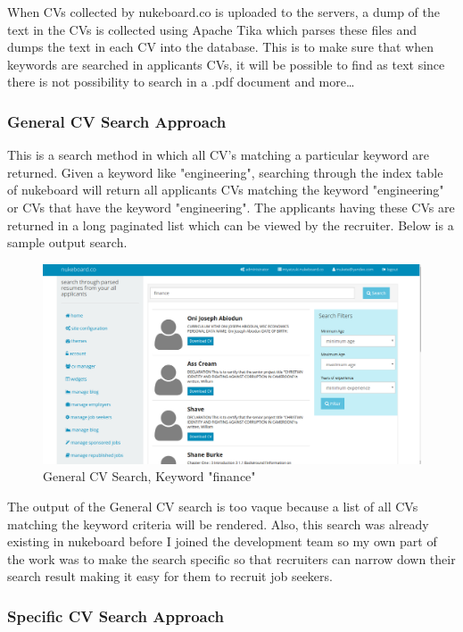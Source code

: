 When CVs collected by nukeboard.co is uploaded to the servers, a dump of the text in the CVs is collected using Apache Tika which parses these files and dumps the text in each CV into the database. This is to make sure that when keywords are searched in applicants CVs, it will be possible to find as text since there is not possibility to search in a .pdf document and more\ldots

\subsubsection{General CV Search Approach}

This is a search method in which all CV's matching a particular keyword are returned. Given a keyword like "engineering", searching through the index table of nukeboard will return all applicants CVs matching the keyword "engineering" or CVs that have the keyword "engineering". The applicants having these CVs are returned in a long paginated list which can be viewed by the recruiter. Below is a sample output search.

\begin{figure}[h]
\centering
\includegraphics[width=13cm,scale=1.5]{Figures/cvGeneralSearch}
\decoRule
\caption[General CV Search Approach]{General CV Search, Keyword "finance"}
\label{fig:cvGeneralSearch}
\end{figure} 

The output of the General CV search is too vaque because a list of all CVs matching the keyword criteria will be rendered. Also, this search was already existing in nukeboard before I joined the development team so my own part of the work was to make the search specific so that recruiters can narrow down their search result making it easy for them to recruit job seekers.

\subsubsection{Specific CV Search Approach}

